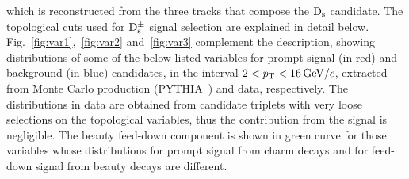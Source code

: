 which is reconstructed from the three tracks that compose the ${\rm D_s}$
candidate. The topological cuts used for ${\rm D_s^{\pm}}$ signal selection
 are explained in detail below. Fig.~\ref{fig:var1},~\ref{fig:var2} and~\ref{fig:var3} complement
 the description, showing distributions of some of the below listed variables
 for prompt signal (in red) and background (in blue) candidates, in the interval $2 < p_{\rm T} < 16 \, \mathrm{GeV}/c$, 
 extracted from Monte Carlo production (PYTHIA~\cite{Sjostrand:2006za}) and data, respectively.
 The distributions in data are obtained from candidate triplets with very loose
 selections on the topological variables, thus the contribution from the signal is negligible.
 The beauty feed-down component is shown
 in green curve for those variables whose distributions for prompt signal
 from charm decays and for feed-down signal from beauty decays are different.
 

